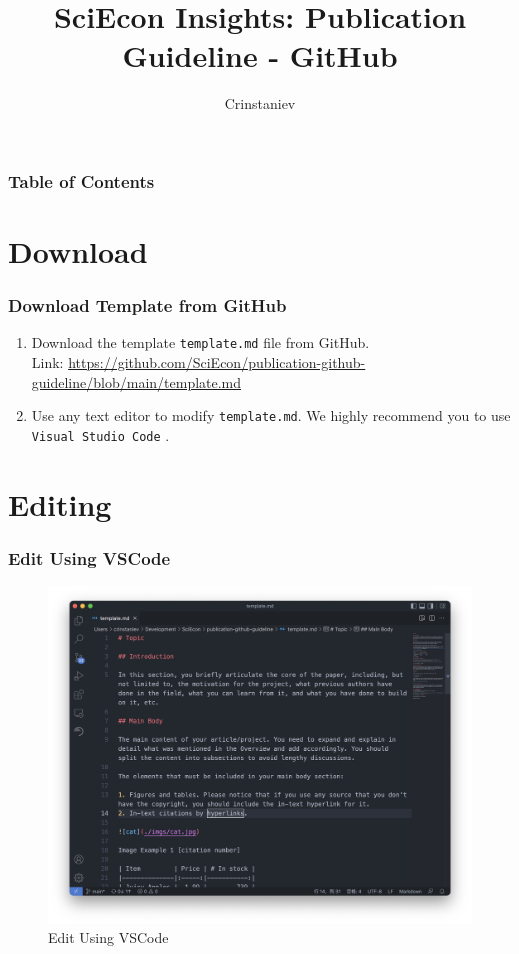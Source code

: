 \documentclass{beamer}
\title{SciEcon Insights: Publication Guideline - GitHub}
\author{Crinstaniev}
\begin{document}
\maketitle

\begin{frame}

	\frametitle{Table of Contents}
	\tableofcontents

\end{frame}

\section{Download}
\begin{frame}
	
	\frametitle{Download Template from GitHub}
	
	\begin{enumerate}
		\item Download the template \texttt{template.md} file from GitHub.\\ 
		Link: \url{https://github.com/SciEcon/publication-github-guideline/blob/main/template.md}
	\item Use any text editor to modify \texttt{template.md}. We highly recommend you to use \texttt{Visual Studio Code} \cite{noauthor_visual_nodate}.
	\end{enumerate}
\end{frame}

\section{Editing}

\begin{frame}
\frametitle{Edit Using VSCode}
\begin{figure}[!htbp]
	\centering
	\includegraphics[width=.6\textwidth]{img/vscode.png}
	\caption{Edit Using VSCode}
\end{figure}
\end{frame}
\end{document}
